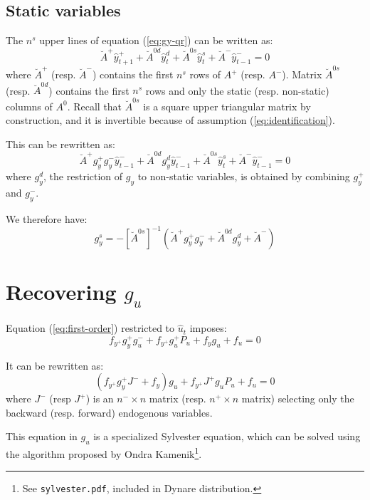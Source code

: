 \documentclass[11pt,a4paper]{article}
\begin{document}
\subsection{Static variables}

The $n^s$ upper lines of equation (\ref{eq:gy-qr}) can be written as:
\begin{equation*}
  \breve{A}^+ \hat{y}^+_{t+1} + \breve{A}^{0d} \hat{y}^d_t + \breve{A}^{0s} \hat{y}^{s}_t + \breve{A}^- \hat{y}^-_{t-1} = 0
\end{equation*}
where $\breve{A}^+$ (resp. $\breve{A}^-$) contains the first $n^s$ rows of $A^+$ (resp. $A^-$). Matrix $\breve{A}^{0s}$ (resp. $\breve{A}^{0d}$) contains the first $n^s$ rows and only the static (resp. non-static) columns of $A^0$. Recall that $\breve{A}^{0s}$ is a square upper triangular matrix by construction, and it is invertible because of assumption (\ref{eq:identification}).

This can be rewritten as:
\begin{equation*}
  \breve{A}^+ g^+_y g^-_y \hat{y}^-_{t-1} + \breve{A}^{0d} g^d_y \hat{y}^-_{t-1} + \breve{A}^{0s} \hat{y}^{s}_t + \breve{A}^- \hat{y}^-_{t-1} = 0
\end{equation*}
where $g^d_y$, the restriction of $g_y$ to non-static variables, is obtained by combining $g^+_y$ and $g^-_y$.

We therefore have:
\begin{equation*}
  g^s_y = -\left[\breve{A}^{0s}\right]^{-1} \left(\breve{A}^+ g^+_y g^-_y + \breve{A}^{0d} g^d_y + \breve{A}^-\right)
\end{equation*}

\section{Recovering $g_u$}

Equation (\ref{eq:first-order}) restricted to $\hat{u}_t$ imposes:
\begin{equation*}
  f_{y^+} g^+_yg^-_u+ f_{y^+}g^+_u P_u + f_y g_u + f_u = 0
\end{equation*}

It can be rewritten as:
\begin{equation*}
  (f_{y^+} g^+_y J^- + f_y) g_u+ f_{y^+}J^+ g_u P_u + f_u = 0
\end{equation*}
where $J^-$ (resp $J^+$) is an $n^-\times n$ matrix (resp. $n^+\times n$ matrix) selecting only the backward (resp. forward) endogenous variables.

This equation in $g_u$ is a specialized Sylvester equation, which can be solved using the algorithm proposed by Ondra Kamenik\footnote{See \texttt{sylvester.pdf}, included in Dynare distribution.}.
\end{document}
